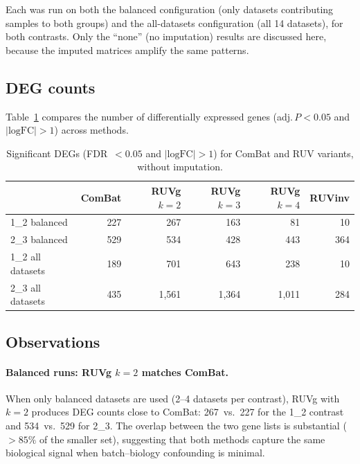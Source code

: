 \documentclass[11pt,a4paper]{article}
\begin{document}
Each was run on both the balanced configuration (only datasets
contributing samples to both groups) and the all-datasets
configuration (all 14 datasets), for both contrasts.  Only the
``none'' (no imputation) results are discussed here, because the
imputed matrices amplify the same patterns.

\subsection{DEG counts}

Table~\ref{tab:ruvdegs} compares the number of differentially
expressed genes (adj.\,$P < 0.05$ and $|\text{logFC}| > 1$) across
methods.

\begin{table}[htbp]
\centering
\caption{Significant DEGs (FDR~$< 0.05$ and $|\text{logFC}| > 1$)
  for ComBat and RUV variants, without imputation.}
\label{tab:ruvdegs}
\small
\begin{tabular}{lrrrrr}
\toprule
& \textbf{ComBat} & \textbf{RUVg $k{=}2$} & \textbf{RUVg $k{=}3$} &
  \textbf{RUVg $k{=}4$} & \textbf{RUVinv} \\
\midrule
1\_2 balanced      & 227   & 267   & 163   & 81    & 10 \\
2\_3 balanced      & 529   & 534   & 428   & 443   & 364 \\
1\_2 all datasets  & 189   & 701   & 643   & 238   & 10 \\
2\_3 all datasets  & 435   & 1{,}561 & 1{,}364 & 1{,}011 & 284 \\
\bottomrule
\end{tabular}
\end{table}

\subsection{Observations}

\paragraph{Balanced runs: RUVg $k{=}2$ matches ComBat.}
When only balanced datasets are used (2--4 datasets per contrast),
RUVg with $k = 2$ produces DEG counts close to ComBat: 267~vs.\ 227
for the 1\_2 contrast and 534~vs.\ 529 for 2\_3.  The overlap
between the two gene lists is substantial ($> 85\%$ of the smaller
set), suggesting that both methods capture the same biological
signal when batch--biology confounding is minimal.
\end{document}
